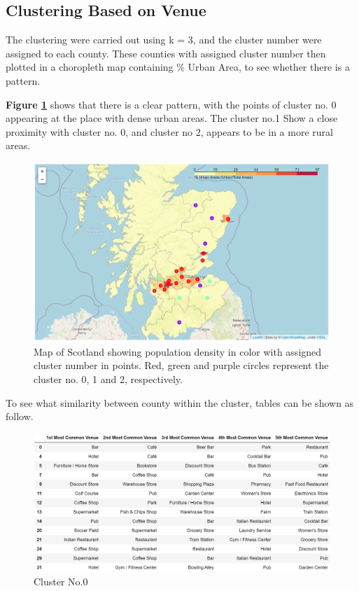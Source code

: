 \documentclass{homeworg}
\begin{document}
\subsection{Clustering Based on Venue}
The clustering were carried out using k = 3, and the cluster number were assigned to each county. These counties with assigned cluster number then plotted in a choropleth map containing \% Urban Area, to see whether there is a pattern. \par
\textbf{Figure \ref{fig:fig13}} shows that there is a clear pattern, with the points of cluster no. 0 appearing at the place with dense urban areas. The cluster no.1 Show a close proximity with cluster no. 0, and cluster no 2, appears to be in a more rural areas.\par
\begin{figure}[!ht]
    \centering
    \includegraphics[scale=0.7]{figure/Figure_9_Clustered_with_percent_urban_areas.png}
    \caption{Map of Scotland showing population density in color with assigned cluster number in points. Red, green and purple circles represent the cluster no. 0, 1 and 2, respectively.}
    \label{fig:fig13}
\end{figure}
To see what similarity between county within the cluster, tables can be shown as follow.\par
\begin{figure}[!ht]
    \centering
    \includegraphics[scale=0.8]{figure/Table_of_Cluster_0.png}
    \caption{Cluster No.0}
    \label{fig:clust0}
\end{figure}
\end{document}
